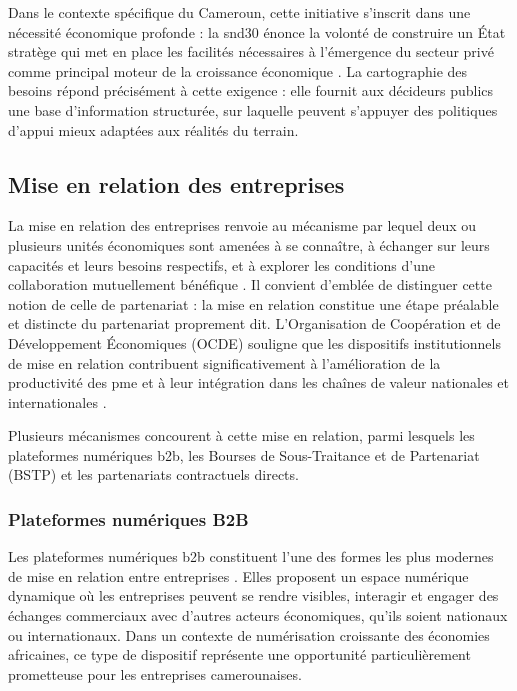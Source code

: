 \documentclass[12pt, a4paper, oneside]{report}
\begin{document}
Dans le contexte spécifique du Cameroun, cette initiative s'inscrit dans une nécessité économique profonde : la \gls{snd30} énonce la volonté de construire un État stratège qui met en place les facilités nécessaires à l'émergence du secteur privé comme principal moteur de la croissance économique \cite{minepat2020}. La cartographie des besoins répond précisément à cette exigence : elle fournit aux décideurs publics une base d'information structurée, sur laquelle peuvent s'appuyer des politiques d'appui mieux adaptées aux réalités du terrain.

\subsection{Mise en relation des entreprises}

La mise en relation des entreprises renvoie au mécanisme par lequel deux ou plusieurs unités économiques sont amenées à se connaître, à échanger sur leurs capacités et leurs besoins respectifs, et à explorer les conditions d'une collaboration mutuellement bénéfique \cite{acceor2024}. Il convient d'emblée de distinguer cette notion de celle de partenariat : la mise en relation constitue une étape préalable et distincte du partenariat proprement dit. L'Organisation de Coopération et de Développement Économiques (OCDE) souligne que les dispositifs institutionnels de mise en relation contribuent significativement à l'amélioration de la productivité des \gls{pme} et à leur intégration dans les chaînes de valeur nationales et internationales \cite{ocde2021}.

Plusieurs mécanismes concourent à cette mise en relation, parmi lesquels les plateformes numériques \gls{b2b}, les Bourses de Sous-Traitance et de Partenariat (BSTP) et les partenariats contractuels directs.

\subsubsection{Plateformes numériques B2B}

Les plateformes numériques \gls{b2b} constituent l'une des formes les plus modernes de mise en relation entre entreprises \cite{acceor2024}. Elles proposent un espace numérique dynamique où les entreprises peuvent se rendre visibles, interagir et engager des échanges commerciaux avec d'autres acteurs économiques, qu'ils soient nationaux ou internationaux. Dans un contexte de numérisation croissante des économies africaines, ce type de dispositif représente une opportunité particulièrement prometteuse pour les entreprises camerounaises.
\end{document}
